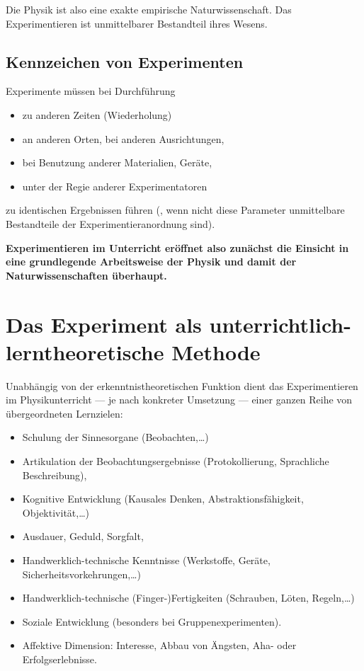 Die Physik ist also eine exakte empirische Naturwissenschaft.
Das Experimentieren ist unmittelbarer Bestandteil ihres Wesens.

\subsection{Kennzeichen von Experimenten}

Experimente m\"{u}ssen bei Durchf\"{u}hrung
\begin{itemize}
	\item
	zu anderen Zeiten (Wiederholung)
	\item
	an anderen Orten, bei anderen Ausrichtungen,
	\item
	bei Benutzung anderer Materialien, Ger\"{a}te,
	\item
	unter der Regie anderer Experimentatoren
\end{itemize}
zu identischen Ergebnissen f\"{u}hren
(, wenn nicht diese Parameter unmittelbare Bestandteile der
Experimentieranordnung sind).

\bip
{ \bf
Experimentieren im Unterricht er\"{o}ffnet also zun\"{a}chst die
Einsicht in eine grundlegende Arbeitsweise der Physik und
damit der Naturwissenschaften \"{u}berhaupt.
}

\bip\bip
\section{Das Experiment als unterrichtlich-lerntheoretische
                                          Methode}

Unabh\"{a}ngig von der erkenntnistheoretischen Funktion dient das
Experimentieren im Physikunterricht
--- je nach konkreter Umsetzung ---
einer ganzen Reihe von \"{u}bergeordneten Lernzielen:

\begin{itemize}
	\item
	Schulung der Sinnesorgane (Beobachten,\dots)
	\item
	Artikulation der Beobachtungsergebnisse (Protokollierung,
	Sprachliche Beschreibung),
	\item
	Kognitive Entwicklung (Kausales Denken, Abstraktionsf\"{a}higkeit,
	                                Objektivit\"{a}t,\dots)
	\item
	Ausdauer, Geduld, Sorgfalt,
	\item
	Handwerklich-technische Kenntnisse
	(Werkstoffe, Ger\"{a}te, Sicherheitsvorkehrungen,\dots)
	\item
	Handwerklich-technische (Finger-)Fertigkeiten
	(Schrauben, L\"{o}ten, Regeln,\dots)
	\item
	Soziale Entwicklung (besonders bei Gruppenexperimenten).
	\item
	Affektive Dimension: Interesse, Abbau von \"{A}ngsten,
	Aha-  oder Erfolgserlebnisse.
\end{itemize}

